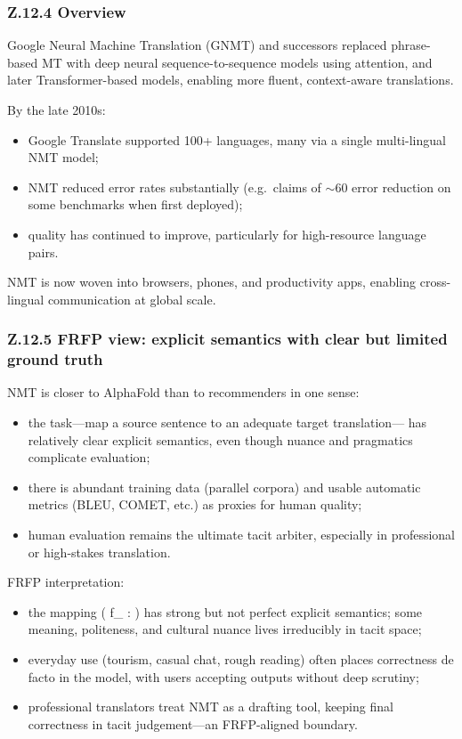 \subsubsection*{Z.12.4 Overview}

Google Neural Machine Translation (GNMT) and successors replaced phrase-
based MT with deep neural sequence-to-sequence models using attention, and
later Transformer-based models, enabling more fluent, context-aware
translations.

By the late 2010s:

\begin{itemize}
\item Google Translate supported 100+ languages, many via a single
multi-lingual NMT model;
\item NMT reduced error rates substantially (e.g.\ claims of $\sim$60%
error reduction on some benchmarks when first deployed);
\item quality has continued to improve, particularly for high-resource
language pairs.
\end{itemize}

NMT is now woven into browsers, phones, and productivity apps, enabling
cross-lingual communication at global scale.

\subsubsection*{Z.12.5 FRFP view: explicit semantics with clear but limited ground truth}

NMT is closer to AlphaFold than to recommenders in one sense:

\begin{itemize}
\item the task---map a source sentence to an adequate target translation---
has relatively clear explicit semantics, even though nuance and
pragmatics complicate evaluation;
\item there is abundant training data (parallel corpora) and usable
automatic metrics (BLEU, COMET, etc.) as proxies for human quality;
\item human evaluation remains the ultimate tacit arbiter, especially in
professional or high-stakes translation.
\end{itemize}

FRFP interpretation:

\begin{itemize}
\item the mapping
(
f_{} :  \to {}
)
has strong but not perfect explicit semantics; some meaning,
politeness, and cultural nuance lives irreducibly in tacit space;
\item everyday use (tourism, casual chat, rough reading) often places
correctness de facto in the model, with users accepting outputs
without deep scrutiny;
\item professional translators treat NMT as a drafting tool, keeping final
correctness in tacit judgement---an FRFP-aligned boundary.
\end{itemize}

